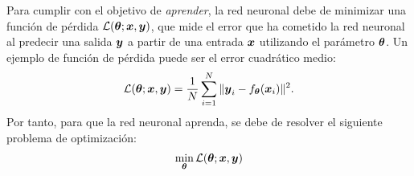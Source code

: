 {{Para cumplir con el objetivo de \emph{aprender}, la red neuronal debe de minimizar una función de pérdida $\mathcal{L}(\vb*{\theta}; \vb*{x}, \vb*{y})$, que mide el error que ha cometido la red neuronal al predecir una salida $\vb*{y}$ a partir de una entrada $\vb*{x}$ utilizando el parámetro $\vb*{\theta}$. Un ejemplo de función de pérdida puede ser el error cuadrático medio:
\begin{equation}
    \mathcal{L}(\vb*{\theta}; \vb*{x}, \vb*{y})
    = \frac{1}{N}
    \sum_{i=1}^{N}
    \|\vb*{y}_i - f_{\vb*{\theta}}(\vb*{x}_i)\|^2.
\end{equation}
Por tanto, para que la red neuronal aprenda, se debe de resolver el siguiente problema de optimización:
\begin{align*}
    \min_{\vb*{\theta}} \mathcal{L}(\vb*{\theta}; \vb*{x}, \vb*{y})
\end{align*}









}}
